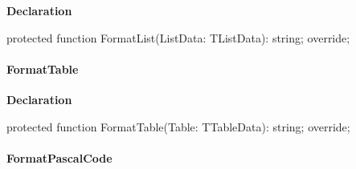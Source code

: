 \documentclass{report}
\newif\ifpdf
\begin{document}
\label{PasDoc_GenLatex.TTexDocGenerator-FormatList}
\begin{list}{}{
\setlength{\itemindent}{0cm}
\setlength{\listparindent}{0cm}
\setlength{\leftmargin}{\evensidemargin}
\addtolength{\leftmargin}{\tmplength}
\settowidth{\labelsep}{X}
\addtolength{\leftmargin}{\labelsep}
\setlength{\labelwidth}{\tmplength}
}
\item[\textbf{Declaration}\hfill]
\ifpdf
\begin{flushleft}
\fi
\begin{ttfamily}
protected function FormatList(ListData: TListData): string; override;\end{ttfamily}

\ifpdf
\end{flushleft}
\fi

\end{list}
\paragraph*{FormatTable}\hspace*{\fill}

\label{PasDoc_GenLatex.TTexDocGenerator-FormatTable}
\begin{list}{}{
\setlength{\itemindent}{0cm}
\setlength{\listparindent}{0cm}
\setlength{\leftmargin}{\evensidemargin}
\addtolength{\leftmargin}{\tmplength}
\settowidth{\labelsep}{X}
\addtolength{\leftmargin}{\labelsep}
\setlength{\labelwidth}{\tmplength}
}
\item[\textbf{Declaration}\hfill]
\ifpdf
\begin{flushleft}
\fi
\begin{ttfamily}
protected function FormatTable(Table: TTableData): string; override;\end{ttfamily}

\ifpdf
\end{flushleft}
\fi

\end{list}
\paragraph*{FormatPascalCode}\hspace*{\fill}
\end{document}
